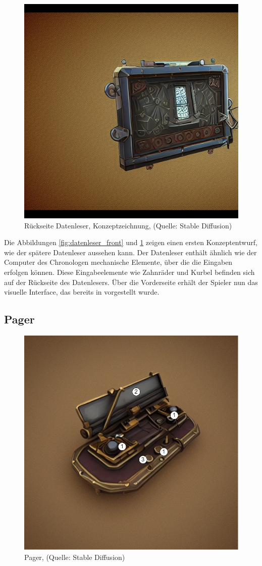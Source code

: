 \begin{figure}[ht]
\centering
\includegraphics[width=.5\linewidth]{content/pictures/Datenleser_rueckseite.jpg}
\caption{Rückseite Datenleser, Konzeptzeichnung, (Quelle: Stable Diffusion)}
\label{fig:datenleser_back}
\end{figure}

Die Abbildungen \ref{fig:datenleser_front} und \ref{fig:datenleser_back} zeigen einen ersten Konzeptentwurf, wie der spätere Datenleser aussehen kann.
Der Datenleser enthält ähnlich wie der Computer des Chronologen mechanische Elemente, über die die Eingaben erfolgen können. Diese Eingabeelemente wie Zahnräder und Kurbel befinden sich auf der Rückseite des Datenlesers. Über die Vorderseite erhält der Spieler nun das visuelle Interface, das bereits in  vorgestellt wurde.

\subsection{Pager}

\begin{figure}[ht]
\centering
\includegraphics[width=.5\linewidth]{content/pictures/Pager_marks.jpg}
\caption{Pager, (Quelle: Stable Diffusion)}
\label{fig:pager}
\end{figure}

